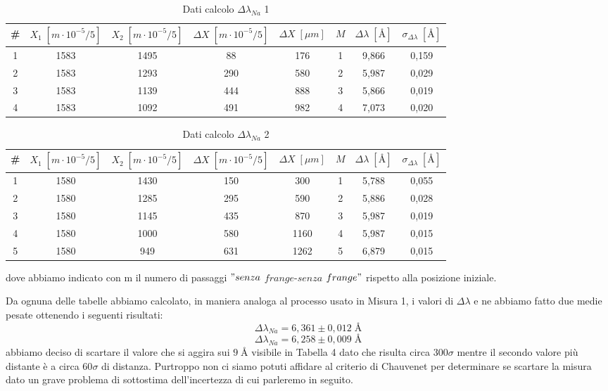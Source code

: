 \documentclass{article}
\begin{document}
\begin{table}[h!]
\centering
\begin{tabular}{ | c | c | c | c | c | c | c | c |}
\hline
 \# & $X_1 \; [m \cdot 10^{-5}/5]$ & $X_2 \; [m \cdot 10^{-5}/5]$ & $\Delta X \; [m \cdot 10^{-5}/5]$ & $\Delta X \; [\mu m]$ & $M$ & $\Delta\lambda \; [\textrm{Å}]$ & $\sigma_{\Delta\lambda} \; [\textrm{Å}]$\\
\hline
   1 & 1583 & 1495 & 88 & 176 & 1 & 9,866 & 0,159\\
   2 & 1583 & 1293 & 290 & 580 & 2 & 5,987 & 0,029\\
   3 & 1583 & 1139 & 444 & 888 & 3 & 5,866 & 0,019\\
   4 & 1583 & 1092 & 491 & 982 & 4 & 7,073 & 0,020\\
\hline
\end{tabular}
\caption{Dati calcolo $\Delta\lambda_{Na}$ 1}
\label{table:4}
\end{table}


\begin{table}[h!]
\centering
\begin{tabular}{ | c | c | c | c | c | c | c | c |}
\hline
\# & $X_1 \; [m \cdot 10^{-5}/5]$ & $X_2 \; [m \cdot 10^{-5}/5]$ & $\Delta X \; [m \cdot 10^{-5}/5]$ & $\Delta X \; [\mu m]$ & $M$ & $\Delta\lambda \; [\textrm{Å}]$ & $\sigma_{\Delta\lambda} \; [\textrm{Å}]$\\
\hline
   1 & 1580 & 1430 & 150 & 300 & 1 & 5,788 & 0,055\\
   2 & 1580 & 1285 & 295 & 590 & 2 & 5,886 & 0,028\\
   3 & 1580 & 1145 & 435 & 870 & 3 & 5,987 & 0,019\\
   4 & 1580 & 1000 & 580 & 1160 & 4 & 5,987 & 0,015\\
   5 & 1580 & 949 & 631 & 1262 & 5 & 6,879 & 0,015\\
\hline
\end{tabular}
\caption{Dati calcolo $\Delta\lambda_{Na}$ 2}
\label{table:5}
\end{table}

dove abbiamo indicato con m il numero di passaggi $"senza$ $frange$-$senza$ $frange"$ rispetto alla posizione iniziale.

Da ognuna delle tabelle abbiamo calcolato, in maniera analoga al processo usato in Misura 1, i valori di $\Delta\lambda$ e ne abbiamo fatto due medie pesate ottenendo i seguenti risultati:
\[ \Delta \lambda_{Na} = 6,361 \pm 0,012 \; \textrm{Å} \]
\[ \Delta \lambda_{Na} = 6,258 \pm 0,009 \; \textrm{Å} \]
abbiamo deciso di scartare il valore che si aggira sui $9 \; \textrm{Å}$ visibile in Tabella 4 dato che risulta circa 300$\sigma$ mentre il secondo valore più distante è a circa 60$\sigma$ di distanza. Purtroppo non ci siamo potuti affidare al criterio di Chauvenet per determinare se scartare la misura dato un grave problema di sottostima dell'incertezza di cui parleremo in seguito.
\end{document}
